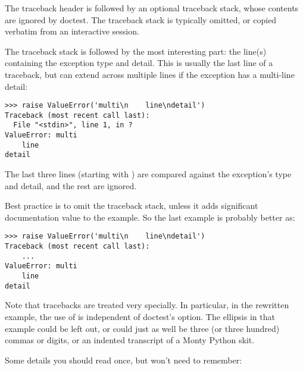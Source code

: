 The traceback header is followed by an optional traceback stack, whose
contents are ignored by doctest.  The traceback stack is typically
omitted, or copied verbatim from an interactive session.

The traceback stack is followed by the most interesting part:  the
line(s) containing the exception type and detail.  This is usually the
last line of a traceback, but can extend across multiple lines if the
exception has a multi-line detail:

\begin{verbatim}
>>> raise ValueError('multi\n    line\ndetail')
Traceback (most recent call last):
  File "<stdin>", line 1, in ?
ValueError: multi
    line
detail
\end{verbatim}

The last three lines (starting with ) are
compared against the exception's type and detail, and the rest are
ignored.

Best practice is to omit the traceback stack, unless it adds
significant documentation value to the example.  So the last example
is probably better as:

\begin{verbatim}
>>> raise ValueError('multi\n    line\ndetail')
Traceback (most recent call last):
    ...
ValueError: multi
    line
detail
\end{verbatim}

Note that tracebacks are treated very specially.  In particular, in the
rewritten example, the use of  is independent of doctest's
 option.  The ellipsis in that example could be left
out, or could just as well be three (or three hundred) commas or digits,
or an indented transcript of a Monty Python skit.

Some details you should read once, but won't need to remember:

